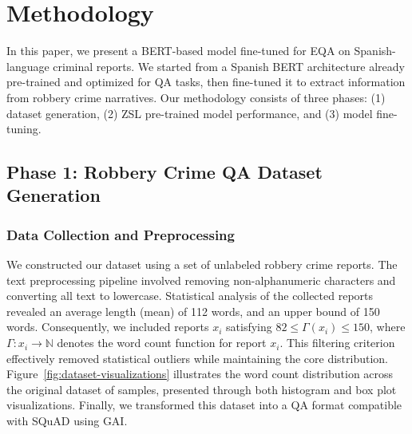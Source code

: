 \documentclass[runningheads]{llncs}
\begin{document}
\section{Methodology}
\label{sec:methodology}
In this paper, we present a BERT-based model fine-tuned for \ac{EQA}
on Spanish-language criminal reports. We started from a Spanish BERT
architecture already pre-trained and optimized for \ac{QA} tasks, then
fine-tuned it to extract information from robbery crime narratives. Our
methodology consists of three phases: (1) dataset generation, (2)
\ac{ZSL} pre-trained model performance, and (3) model fine-tuning.


\subsection{Phase 1: Robbery Crime QA Dataset Generation}
\label{sec:robb-crime-quest}

\subsubsection{Data Collection and Preprocessing}
\label{sec:data-collection}
We constructed our dataset using a set of unlabeled robbery crime
reports. The text preprocessing pipeline involved removing
non-alphanumeric characters and converting all text to
lowercase. Statistical analysis of the collected reports revealed an
average length (mean) of 112 words, and an upper bound of 150
words. Consequently, we included reports $x_i$ satisfying
$82 \leq \Gamma(x_i) \leq 150$, where
$\Gamma: x_i \rightarrow \mathbb{N}$ denotes the word count function
for report $x_i$. This filtering criterion effectively removed
statistical outliers while maintaining the core
distribution. Figure~\ref{fig:dataset-visualizations} illustrates the
word count distribution across the original dataset of
 samples, presented through both histogram and box
plot visualizations. Finally, we transformed this dataset into a
\ac{QA} format compatible with \ac{SQuAD} using \ac{GAI}.


  
\end{document}
